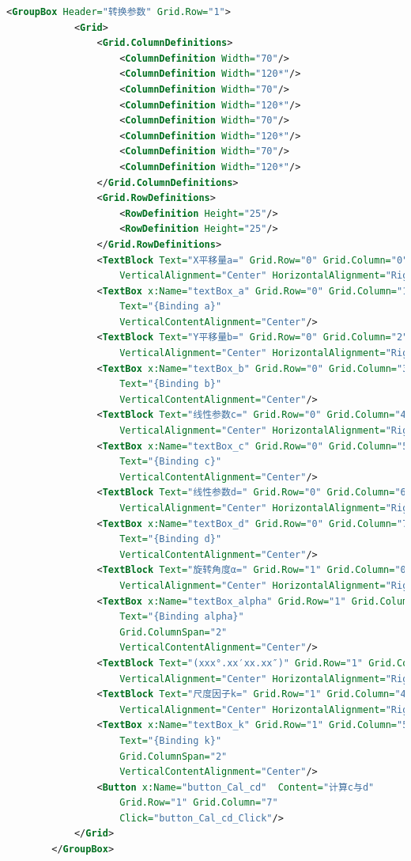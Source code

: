 \begin{lstlisting}[language=xml]
        <GroupBox Header="转换参数" Grid.Row="1">
            <Grid>
                <Grid.ColumnDefinitions>
                    <ColumnDefinition Width="70"/>
                    <ColumnDefinition Width="120*"/>
                    <ColumnDefinition Width="70"/>
                    <ColumnDefinition Width="120*"/>
                    <ColumnDefinition Width="70"/>
                    <ColumnDefinition Width="120*"/>
                    <ColumnDefinition Width="70"/>
                    <ColumnDefinition Width="120*"/>
                </Grid.ColumnDefinitions>
                <Grid.RowDefinitions>
                    <RowDefinition Height="25"/>
                    <RowDefinition Height="25"/>
                </Grid.RowDefinitions>
                <TextBlock Text="X平移量a=" Grid.Row="0" Grid.Column="0" 
                    VerticalAlignment="Center" HorizontalAlignment="Right"/>
                <TextBox x:Name="textBox_a" Grid.Row="0" Grid.Column="1" 
                    Text="{Binding a}" 
                    VerticalContentAlignment="Center"/>
                <TextBlock Text="Y平移量b=" Grid.Row="0" Grid.Column="2"  
                    VerticalAlignment="Center" HorizontalAlignment="Right"/>
                <TextBox x:Name="textBox_b" Grid.Row="0" Grid.Column="3"  
                    Text="{Binding b}"
                    VerticalContentAlignment="Center"/>
                <TextBlock Text="线性参数c=" Grid.Row="0" Grid.Column="4" 
                    VerticalAlignment="Center" HorizontalAlignment="Right"/>
                <TextBox x:Name="textBox_c" Grid.Row="0" Grid.Column="5" 
                    Text="{Binding c}"
                    VerticalContentAlignment="Center"/>
                <TextBlock Text="线性参数d=" Grid.Row="0" Grid.Column="6" 
                    VerticalAlignment="Center" HorizontalAlignment="Right"/>
                <TextBox x:Name="textBox_d" Grid.Row="0" Grid.Column="7"  
                    Text="{Binding d}" 
                    VerticalContentAlignment="Center"/>
                <TextBlock Text="旋转角度α=" Grid.Row="1" Grid.Column="0" 
                    VerticalAlignment="Center" HorizontalAlignment="Right"/>
                <TextBox x:Name="textBox_alpha" Grid.Row="1" Grid.Column="1"  
                    Text="{Binding alpha}" 
                    Grid.ColumnSpan="2"
                    VerticalContentAlignment="Center"/>
                <TextBlock Text="(xxx°.xx′xx.xx″)" Grid.Row="1" Grid.Column="3" 
                    VerticalAlignment="Center" HorizontalAlignment="Right"/>
                <TextBlock Text="尺度因子k=" Grid.Row="1" Grid.Column="4" 
                    VerticalAlignment="Center" HorizontalAlignment="Right"/>
                <TextBox x:Name="textBox_k" Grid.Row="1" Grid.Column="5" 
                    Text="{Binding k}" 
                    Grid.ColumnSpan="2"
                    VerticalContentAlignment="Center"/>
                <Button x:Name="button_Cal_cd"  Content="计算c与d"
                    Grid.Row="1" Grid.Column="7" 
                    Click="button_Cal_cd_Click"/>
            </Grid>
        </GroupBox>


\end{lstlisting}
